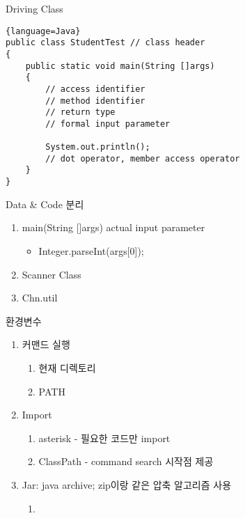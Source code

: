 \documentclass[11pt]{article}
\begin{document}
\bigskip
{\Large Driving Class}
\begin{lstlisting}{language=Java}
public class StudentTest // class header
{
    public static void main(String []args)
    {
        // access identifier
        // method identifier
        // return type      
        // formal input parameter

        System.out.println();
        // dot operator, member access operator
    }
}
\end{lstlisting}
\bigskip
{\Large Data \& Code 분리}
\begin{enumerate}
    \item main(String []args) actual input parameter
    \begin{itemize}
        \item Integer.parseInt(args[0]);
    \end{itemize}
    \item Scanner Class
    \item Chn.util
\end{enumerate}
\bigskip
{\Large 환경변수}
\begin{enumerate}
    \item 커맨드 실행
    \begin{enumerate}
        \item 현재 디렉토리
        \item PATH
    \end{enumerate}
    \item Import
    \begin{enumerate}
        \item asterisk - 필요한 코드만 import
        \item ClassPath - command search 시작점 제공
    \end{enumerate}
    \item Jar: java archive; zip이랑 같은 압축 알고리즘 사용
    \begin{enumerate}
        \item 
    \end{enumerate}
\end{enumerate}
\end{document}
